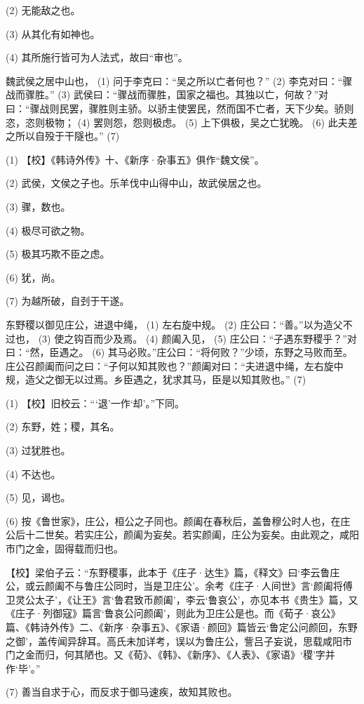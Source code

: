 \documentclass[12pt,UTF8]{ctexbook}
\begin{document}
(2) 无能敌之也。

(3) 从其化有如神也。

(4) 其所施行皆可为人法式，故曰“审也”。

魏武侯之居中山也， (1) 问于李克曰：“吴之所以亡者何也？” (2) 李克对曰：“骤战而骤胜。” (3) 武侯曰：“骤战而骤胜，国家之福也。其独以亡，何故？”对曰：“骤战则民罢，骤胜则主骄。以骄主使罢民，然而国不亡者，天下少矣。骄则恣，恣则极物； (4) 罢则怨，怨则极虑。 (5) 上下俱极，吴之亡犹晚。 (6) 此夫差之所以自殁于干隧也。” (7)

(1) 【校】《韩诗外传》十、《新序·杂事五》俱作“魏文侯”。

(2) 武侯，文侯之子也。乐羊伐中山得中山，故武侯居之也。

(3) 骤，数也。

(4) 极尽可欲之物。

(5) 极其巧欺不臣之虑。

(6) 犹，尚。

(7) 为越所破，自刭于干遂。

东野稷以御见庄公，进退中绳， (1) 左右旋中规。 (2) 庄公曰：“善。”以为造父不过也， (3) 使之钩百而少及焉。 (4) 颜阖入见， (5) 庄公曰：“子遇东野稷乎？”对曰：“然，臣遇之。 (6) 其马必败。”庄公曰：“将何败？”少顷，东野之马败而至。庄公召颜阖而问之曰：“子何以知其败也？”颜阖对曰：“夫进退中绳，左右旋中规，造父之御无以过焉。乡臣遇之，犹求其马，臣是以知其败也。” (7)

(1) 【校】旧校云：“‘退’一作‘却’。”下同。

(2) 东野，姓；稷，其名。

(3) 过犹胜也。

(4) 不达也。

(5) 见，谒也。

(6) 按《鲁世家》，庄公，桓公之子同也。颜阖在春秋后，盖鲁穆公时人也，在庄公后十二世矣。若实庄公，颜阖为妄矣。若实颜阖，庄公为妄矣。由此观之，咸阳市门之金，固得载而归也。

【校】梁伯子云：“东野稷事，此本于《庄子·达生》篇，《释文》曰‘李云鲁庄公，或云颜阖不与鲁庄公同时，当是卫庄公’。余考《庄子·人间世》言‘颜阖将傅卫灵公太子’，《让王》言‘鲁君致币颜阖’，李云‘鲁哀公’，亦见本书《贵生》篇，又《庄子·列御寇》篇言‘鲁哀公问颜阖’，则此为卫庄公是也。而《荀子·哀公》篇、《韩诗外传》二、《新序·杂事五》、《家语·颜回》篇皆云‘鲁定公问颜回，东野之御’，盖传闻异辞耳。高氏未加详考，误以为鲁庄公，訾吕子妄说，思载咸阳市门之金而归，何其陋也。又《荀》、《韩》、《新序》、《人表》、《家语》‘稷’字并作‘毕’。”

(7) 善当自求于心，而反求于御马速疾，故知其败也。
\end{document}
